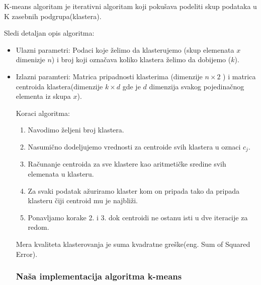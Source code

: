 \documentclass{article}
\begin{document}
K-means algoritam je iterativni algoritam koji poku\v{s}ava podeliti skup podataka u K zasebnih podgrupa(klastera).

Sledi detaljan opis algoritma:

\begin{itemize}

\item Ulazni parametri: Podaci koje \v{z}elimo da klasterujemo (skup elemenata $x$ dimenizje $n$) i broj koji ozna\v{c}ava koliko klastera \v{z}elimo da dobijemo ($k$).
\item Izlazni paramteri: Matrica pripadnosti klasterima (dimenzije $n \times 2$ ) i matrica centroida klastera(dimenzije $k \times d$ gde je $d$ dimenzija svakog pojedina\v{c}nog elementa iz skupa $x$).

Koraci algoritma:

\begin{enumerate}

\item Navodimo \v{z}eljeni broj klastera.
\item Nasumi\v{c}no dodeljujemo vrednosti za centroide svih klastera u oznaci $c_j$. 
\item Ra\v{c}unanje centroida za sve klastere kao aritmeti\v{c}ke sredine svih elemenata u klasteru.
\item Za svaki podatak a\v{z}uriramo klaster kom on pripada tako da pripada klasteru \v{c}iji centroid mu je najbli\v{z}i.
\item Ponavljamo korake 2. i 3. dok centroidi ne ostanu isti u dve iteracije za redom.

\end{enumerate}

Mera kvaliteta klasterovanja je suma kvadratne gre\v{s}ke(eng. {\selectfont Sum of Squared Error}).

\subsubsection{\selectfont Na\v{s}a implementacija algoritma {\selectfont k-means}}


\end{itemize}
\end{document}
